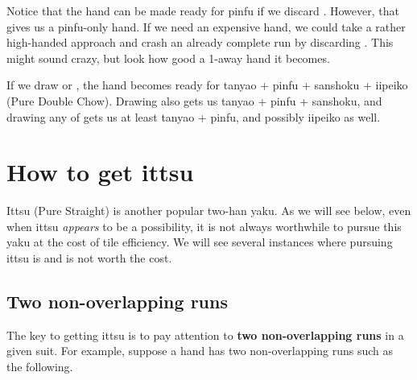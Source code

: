 \bigskip
Notice that the hand can be made ready for {\jap pinfu} if we discard {\LARGE{}}. However, that gives us a {\jap pinfu}-only hand. If we need an expensive hand, we could take a rather high-handed approach and crash an already complete run by discarding {\LARGE{}}. This might sound crazy, but look how good a 1-away hand it becomes.

\bp
{}
\ep

\bigskip
If we draw {\LARGE{}} or {\LARGE{}}, the hand becomes ready for {\jap tanyao + pinfu + sanshoku + iipeiko} (Pure Double Chow). Drawing {\LARGE{}} also gets us {\jap tanyao + pinfu + sanshoku}, and drawing any of {\LARGE{}   } gets us at least {\jap tanyao + pinfu}, and possibly {\jap iipeiko} as well. 

\newpage
\section{How to get {\jap ittsu}}\label{sec:itt}

{\jap Ittsu} (Pure Straight) is another popular two-{\jap han yaku}. As we will see below, even when {\jap ittsu} \emph{appears} to be a possibility, it is not always worthwhile to pursue this {\jap yaku} at the cost of tile efficiency. We will see several instances where pursuing {\jap ittsu} is and is not worth the cost.

\bigskip
\subsection{Two non-overlapping runs}
The key to getting {\jap ittsu} is to pay attention to {\bf two non-overlapping runs} in a given suit. For example, suppose a hand has two non-overlapping runs such as the following. 



